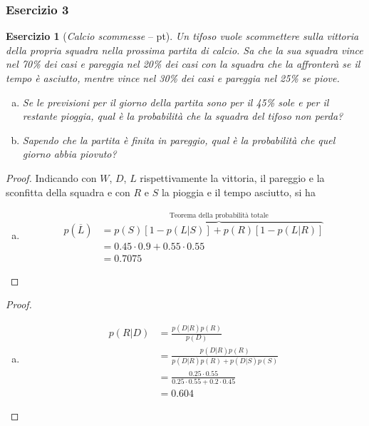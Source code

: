 \documentclass{beamer}
\newtheorem{exercise}{Esercizio}
\renewcommand\qedsymbol{$\blacksquare$}
\begin{document}
\begin{frame}[fragile]
	\frametitle{Esercizio 3}

	\begin{exercise}[\textit{Calcio scommesse} -- \pointsQc pt]

		Un tifoso vuole scommettere sulla vittoria della propria squadra nella prossima partita di calcio. Sa che la sua squadra vince nel 70\% dei casi e pareggia nel 20\% dei casi con la squadra che la affronterà se il tempo è asciutto, mentre vince nel 30\% dei casi e pareggia nel 25\% se piove.

		\begin{enumerate}[(a)]
			\item Se le previsioni per il giorno della partita sono per il 45\% sole e per il restante pioggia, qual è la probabilità che la squadra del tifoso non perda?
			\item Sapendo che la partita è finita in pareggio, qual è la probabilità che quel giorno abbia piovuto?
		\end{enumerate}
	\end{exercise}
\end{frame}

\begin{frame}[fragile]
	\begin{proof}\renewcommand{\qedsymbol}{$\square$}

		Indicando con $W$, $D$, $L$ rispettivamente la vittoria, il pareggio e la sconfitta della squadra e con $R$ e $S$ la pioggia e il tempo asciutto, si ha

		\begin{enumerate}[(a)]
			\item \begin{align*}
				      p(\overline{L}) & = \overbrace{p(S)\left[1 - p(L|S) \right] + p(R)\left[1 - p(L|R) \right]}^{\text{Teorema della probabilità totale}} \\
				      & = 0.45\cdot0.9+0.55\cdot0.55 \\
				      & = 0.7075
			      \end{align*}
		\end{enumerate}
	\end{proof}
\end{frame}

\begin{frame}[fragile]
	\begin{proof}%
		\begin{enumerate}[(b)]
			\item \begin{align*}
				      p(R|D) & = \frac{p(D|R)p(R)}{p(D)} \\
				      & = \frac{p(D|R)p(R)}{p(D|R)p(R)+p(D|S)p(S)} \\
				      & = \frac{0.25\cdot0.55}{0.25\cdot0.55+0.2\cdot0.45} \\
				      & = 0.604
			      \end{align*}
		\end{enumerate}
	\end{proof}
\end{frame}
\end{document}
